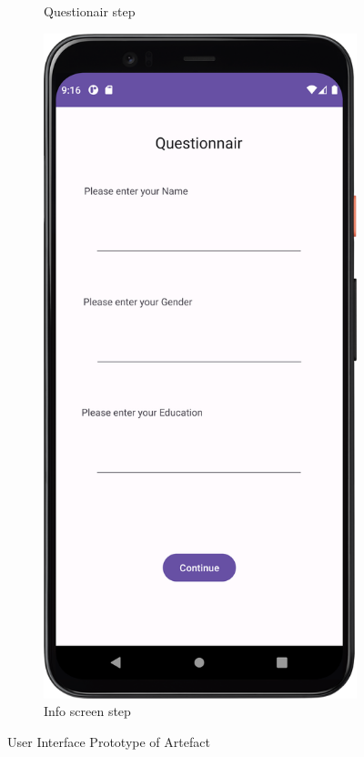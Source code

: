 \begin{figure}[htbp]
\begin{subfigure}[b]{0.3\textwidth}
        \caption{ Questionair step}
        \label{subfig:Questionair2}
    \end{subfigure}
    \hfill
    \begin{subfigure}[b]{0.3\textwidth}
        \centering
        \includegraphics[width=\textwidth]{content/06_demonstration_of_the_artifact/Screenshot_QuestionnairScreen.png}
        \caption{Info screen step}
        \label{subfig:InfoScreen2}
    \end{subfigure}
       \caption{User Interface Prototype of Artefact}
       \label{fig:uiScreens}
\end{figure}

